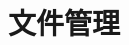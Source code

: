 \documentclass[./operating-systems.tex]{subfiles}
\begin{document}
    \section{文件管理}
\end{document}
